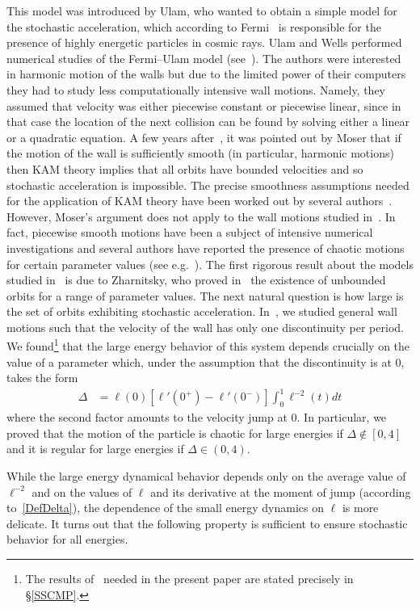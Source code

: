 \documentclass[10pt]{amsart}
\theoremstyle{definition}\newtheorem{defi}[theo]{Definition}\newtheorem{rema}[theo]{Remark}\newtheorem{exam}[theo]{Example}\newtheorem{exem}[theo]{Example}\newtheorem{nota}[theo]{Notation}
\begin{document}
This model was introduced by Ulam, who wanted to obtain a simple model for the stochastic acceleration, which according to Fermi~\cite{F49, F54} is responsible for the presence of highly energetic particles in cosmic rays. Ulam and Wells performed numerical studies of the Fermi--Ulam model (see~\cite{U}). The authors were interested in harmonic motion of the walls but due to the limited power of their computers they had to study less computationally intensive wall motions. Namely, they assumed that velocity was either piecewise constant or piecewise linear, since in that case the location of the next collision can be found by solving either a linear or a quadratic equation. A few years after~\cite{U}, it was pointed out by Moser that if the motion of the wall is sufficiently smooth (in particular, harmonic motions) then KAM theory implies that all orbits have bounded velocities and so stochastic acceleration is impossible. The precise smoothness assumptions needed for the application of KAM theory have been worked out by several authors~\cite{Do, LL, P2, P1}. However, Moser's argument does not apply to the wall motions studied in~\cite{U}. In fact, piecewise smooth motions have been a subject of intensive numerical investigations and several authors have reported the presence of chaotic motions for certain parameter values (see e.g.~\cite{Br, CZ}). The first rigorous result about the models studied in~\cite{U} is due to Zharnitsky, who proved in~\cite{Z} the existence of unbounded orbits for a range of parameter values. The next natural question is how large is the set of orbits exhibiting stochastic acceleration. In~\cite{fum}, we studied general wall motions such that the velocity of the wall has only one discontinuity per period. We found\footnote{The results of~\cite{fum} needed in the present paper are stated precisely in \S\ref{SSCMP}.} that the large energy behavior of this system depends crucially on the value of a parameter which, under the assumption that the discontinuity is at $0$, takes the form
\begin{align}\label{DefDelta}
\Delta &= \ell(0) \left[\ell'(0^{+})-\ell'(0^{-})\right] \int_0^1 \ell^{-2}(t) dt
\end{align}
where the second factor amounts to the velocity jump at $0$. In particular, we proved that the motion of the particle is chaotic for large energies if $\Delta\not\in[0,4]$ and it is regular for large energies if $\Delta\in(0,4)$.

While the large energy dynamical behavior depends only on the average value of $\ell^{-2}$ and on the values of $\ell$ and its derivative at the moment of jump (according to~\eqref{DefDelta}), the dependence of the small energy dynamics on $\ell$ is more delicate. It turns out that the following property is sufficient to ensure stochastic behavior for all energies.
\end{document}

